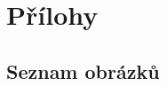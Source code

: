 \appendix
{}\thispagestyle{empty}  \renewcommand{\appendixname}{P\v{r}iloha}%


\part*{Přílohy}


\chapter[\noindent Seznam obrázků]{\noindent Seznam obrázků}


\section*{\noindent \label{tab:zkratky}}

